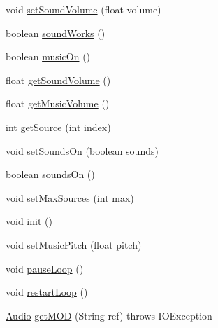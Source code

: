 \begin{DoxyCompactItemize}
\item 
void \mbox{\hyperlink{classorg_1_1newdawn_1_1slick_1_1openal_1_1_sound_store_a3dc73a371a758af845cff776986072c0}{set\+Sound\+Volume}} (float volume)
\item 
boolean \mbox{\hyperlink{classorg_1_1newdawn_1_1slick_1_1openal_1_1_sound_store_ae563e9c1a01e333dc2350f1450f451fd}{sound\+Works}} ()
\item 
boolean \mbox{\hyperlink{classorg_1_1newdawn_1_1slick_1_1openal_1_1_sound_store_adcedd31c54dcfb04bfb1f546d6ee17dd}{music\+On}} ()
\item 
float \mbox{\hyperlink{classorg_1_1newdawn_1_1slick_1_1openal_1_1_sound_store_a3c3ac504e4b551ce44dce18935cffd9e}{get\+Sound\+Volume}} ()
\item 
float \mbox{\hyperlink{classorg_1_1newdawn_1_1slick_1_1openal_1_1_sound_store_aee392a77caa99f7a2240ed4fd677b4fb}{get\+Music\+Volume}} ()
\item 
int \mbox{\hyperlink{classorg_1_1newdawn_1_1slick_1_1openal_1_1_sound_store_a36b83b67fccef1cd5167d2ea11e89f6a}{get\+Source}} (int index)
\item 
void \mbox{\hyperlink{classorg_1_1newdawn_1_1slick_1_1openal_1_1_sound_store_a901fb679a53489b4dd042c12586be4e7}{set\+Sounds\+On}} (boolean \mbox{\hyperlink{classorg_1_1newdawn_1_1slick_1_1openal_1_1_sound_store_a64f1d8fb16c0b816d20abf0e695a85ec}{sounds}})
\item 
boolean \mbox{\hyperlink{classorg_1_1newdawn_1_1slick_1_1openal_1_1_sound_store_afde3bd643c0a7b312643a8a8aa1d0524}{sounds\+On}} ()
\item 
void \mbox{\hyperlink{classorg_1_1newdawn_1_1slick_1_1openal_1_1_sound_store_afdd7d412cc9a82f228fd9e6df4c96ca4}{set\+Max\+Sources}} (int max)
\item 
void \mbox{\hyperlink{classorg_1_1newdawn_1_1slick_1_1openal_1_1_sound_store_a7fd1e14b653086f50974269e255533ac}{init}} ()
\item 
void \mbox{\hyperlink{classorg_1_1newdawn_1_1slick_1_1openal_1_1_sound_store_aaae95ffb59ac30b247edff6476450a1d}{set\+Music\+Pitch}} (float pitch)
\item 
void \mbox{\hyperlink{classorg_1_1newdawn_1_1slick_1_1openal_1_1_sound_store_af8650bad0ed902a74410a079a5df9098}{pause\+Loop}} ()
\item 
void \mbox{\hyperlink{classorg_1_1newdawn_1_1slick_1_1openal_1_1_sound_store_a7db8559efbd080f1c7eed7ce34415a54}{restart\+Loop}} ()
\item 
\mbox{\hyperlink{interfaceorg_1_1newdawn_1_1slick_1_1openal_1_1_audio}{Audio}} \mbox{\hyperlink{classorg_1_1newdawn_1_1slick_1_1openal_1_1_sound_store_a246badbe8459ae466b1e1b41e838c3f5}{get\+M\+OD}} (String ref)  throws I\+O\+Exception 

\end{DoxyCompactItemize}
